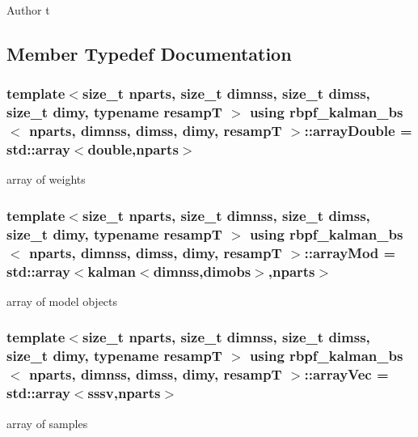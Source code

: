 \begin{DoxyAuthor}{Author}
t 
\end{DoxyAuthor}


\subsection{Member Typedef Documentation}
\subsubsection[{\texorpdfstring{array\+Double}{arrayDouble}}]{\setlength{\rightskip}{0pt plus 5cm}template$<$size\+\_\+t nparts, size\+\_\+t dimnss, size\+\_\+t dimss, size\+\_\+t dimy, typename resampT $>$ using {\bf rbpf\+\_\+kalman\+\_\+bs}$<$ nparts, dimnss, dimss, dimy, resampT $>$\+::{\bf array\+Double} =  std\+::array$<$double,nparts$>$}\hypertarget{classrbpf__kalman__bs_a4f03888e8fc3a8c9402bde23823561de}{}\label{classrbpf__kalman__bs_a4f03888e8fc3a8c9402bde23823561de}
array of weights 
\subsubsection[{\texorpdfstring{array\+Mod}{arrayMod}}]{\setlength{\rightskip}{0pt plus 5cm}template$<$size\+\_\+t nparts, size\+\_\+t dimnss, size\+\_\+t dimss, size\+\_\+t dimy, typename resampT $>$ using {\bf rbpf\+\_\+kalman\+\_\+bs}$<$ nparts, dimnss, dimss, dimy, resampT $>$\+::{\bf array\+Mod} =  std\+::array$<${\bf kalman}$<$dimnss,dimobs$>$,nparts$>$}\hypertarget{classrbpf__kalman__bs_aa7f8e240e96a4272142f3d60fbd0d007}{}\label{classrbpf__kalman__bs_aa7f8e240e96a4272142f3d60fbd0d007}
array of model objects 
\subsubsection[{\texorpdfstring{array\+Vec}{arrayVec}}]{\setlength{\rightskip}{0pt plus 5cm}template$<$size\+\_\+t nparts, size\+\_\+t dimnss, size\+\_\+t dimss, size\+\_\+t dimy, typename resampT $>$ using {\bf rbpf\+\_\+kalman\+\_\+bs}$<$ nparts, dimnss, dimss, dimy, resampT $>$\+::{\bf array\+Vec} =  std\+::array$<${\bf sssv},nparts$>$}\hypertarget{classrbpf__kalman__bs_aad6c02f9c5db3937db418d3fc80deb4d}{}\label{classrbpf__kalman__bs_aad6c02f9c5db3937db418d3fc80deb4d}
array of samples 
